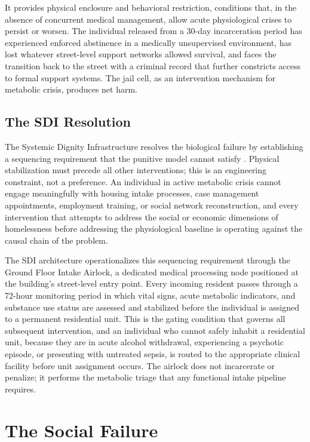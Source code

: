 \documentclass[12pt, letterpaper]{article}
\begin{document}
It provides physical enclosure and behavioral restriction, conditions that, in the absence of concurrent medical management, allow acute physiological crises to persist or worsen. The individual released from a 30-day incarceration period has experienced enforced abstinence in a medically unsupervised environment, has lost whatever street-level support networks allowed survival, and faces the transition back to the street with a criminal record that further constricts access to formal support systems. The jail cell, as an intervention mechanism for metabolic crisis, produces net harm.

\subsection{The SDI Resolution}

The Systemic Dignity Infrastructure resolves the biological failure by establishing a sequencing requirement that the punitive model cannot satisfy \citep{dibella_wp1_2026}. Physical stabilization must precede all other interventions; this is an engineering constraint, not a preference. An individual in active metabolic crisis cannot engage meaningfully with housing intake processes, case management appointments, employment training, or social network reconstruction, and every intervention that attempts to address the social or economic dimensions of homelessness before addressing the physiological baseline is operating against the causal chain of the problem.

The SDI architecture operationalizes this sequencing requirement through the Ground Floor Intake Airlock, a dedicated medical processing node positioned at the building's street-level entry point. Every incoming resident passes through a 72-hour monitoring period in which vital signs, acute metabolic indicators, and substance use status are assessed and stabilized before the individual is assigned to a permanent residential unit. This is the gating condition that governs all subsequent intervention, and an individual who cannot safely inhabit a residential unit, because they are in acute alcohol withdrawal, experiencing a psychotic episode, or presenting with untreated sepsis, is routed to the appropriate clinical facility before unit assignment occurs. The airlock does not incarcerate or penalize; it performs the metabolic triage that any functional intake pipeline requires.


\section{The Social Failure}
\end{document}
